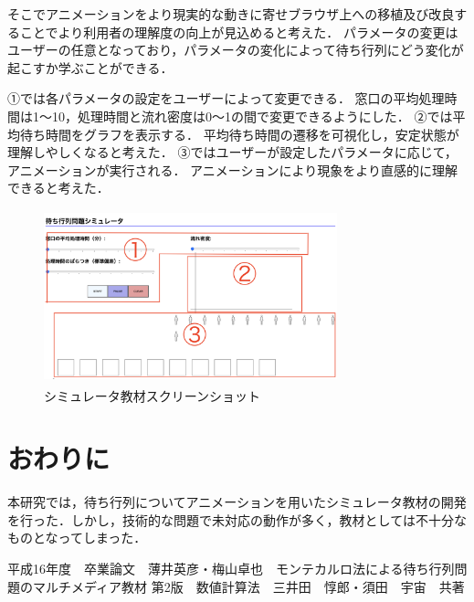 \documentclass[twocolumn,10pt,a4j]{ltjsarticle}
\begin{document}
そこでアニメーションをより現実的な動きに寄せブラウザ上への移植及び改良することでより利用者の理解度の向上が見込めると考えた．
パラメータの変更はユーザーの任意となっており，パラメータの変化によって待ち行列にどう変化が起こすか学ぶことができる．

①では各パラメータの設定をユーザーによって変更できる．
窓口の平均処理時間は1〜10，処理時間と流れ密度は0〜1の間で変更できるようにした．
②では平均待ち時間をグラフを表示する．
平均待ち時間の遷移を可視化し，安定状態が理解しやしくなると考えた．
③ではユーザーが設定したパラメータに応じて，アニメーションが実行される．
アニメーションにより現象をより直感的に理解できると考えた．

\begin{figure}[h]
\begin{center}
\includegraphics[clip,width=85mm,height=50mm]{figures/layout_ex.pdf}
\end{center}
\caption{シミュレータ教材スクリーンショット}
\label{fig:教科書}
\end{figure}

\section{おわりに}
本研究では，待ち行列についてアニメーションを用いたシミュレータ教材の開発を行った．しかし，技術的な問題で未対応の動作が多く，教材としては不十分なものとなってしまった．

\begin{thebibliography}{99}
平成16年度　卒業論文　薄井英彦・梅山卓也　モンテカルロ法による待ち行列問題のマルチメディア教材
 第2版　数値計算法　三井田　惇郎・須田　宇宙　共著
\end{thebibliography}
\end{document}
